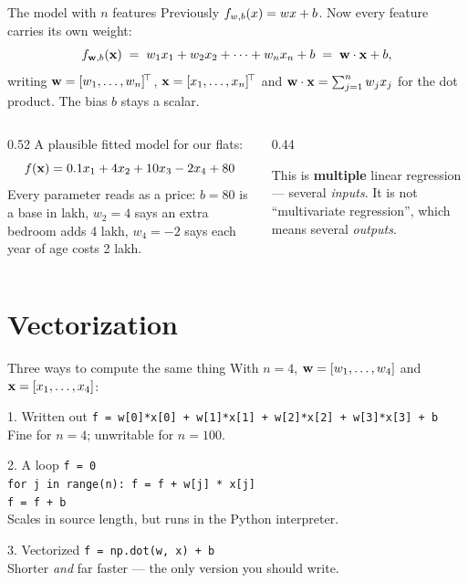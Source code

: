 \documentclass[aspectratio=169,10pt]{beamer}
\begin{document}
\begin{frame}{The model with $n$ features}
  \small
  Previously $f_{w,b}(x)=wx+b$. Now every feature carries its own weight:
  \[
    f_{\mathbf{w},b}(\mathbf{x}) \;=\; w_1x_1 + w_2x_2 + \dots + w_nx_n + b
    \;=\; \mathbf{w}\cdot\mathbf{x} + b ,
  \]
  writing $\mathbf{w}=[w_1,\dots,w_n]^{\!\top}$, $\mathbf{x}=[x_1,\dots,x_n]^{\!\top}$ and
  $\mathbf{w}\cdot\mathbf{x}=\sum_{j=1}^{n}w_jx_j$ for the dot product. The bias $b$ stays a scalar.
  \begin{columns}[T,onlytextwidth]
    \begin{column}{0.52\textwidth}
      \footnotesize
      A plausible fitted model for our flats:
      \[ f(\mathbf{x}) = 0.1x_1 + 4x_2 + 10x_3 - 2x_4 + 80 \]
      Every parameter reads as a price: $b=80$ is a base in lakh, $w_2=4$ says an extra
      bedroom adds 4 lakh, $w_4=-2$ says each year of age costs 2 lakh.
    \end{column}
    \begin{column}{0.44\textwidth}
      \begin{keyidea}
        \footnotesize
        This is \textbf{multiple} linear regression --- several \emph{inputs}. It is not
        ``multivariate regression'', which means several \emph{outputs}.
      \end{keyidea}
    \end{column}
  \end{columns}
\end{frame}

\section{Vectorization}

\begin{frame}{Three ways to compute the same thing}
  \footnotesize
  With $n=4$, $\mathbf{w} = [w_1,\dots,w_4]$ and $\mathbf{x}=[x_1,\dots,x_4]$:
  \begin{block}{1. Written out}
    \texttt{f = w[0]*x[0] + w[1]*x[1] + w[2]*x[2] + w[3]*x[3] + b}\\
    Fine for $n=4$; unwritable for $n=100$.
  \end{block}
  \begin{block}{2. A loop}
    \texttt{f = 0}\\
    \texttt{for j in range(n): f = f + w[j] * x[j]}\\
    \texttt{f = f + b}\\
    Scales in source length, but runs in the Python interpreter.
  \end{block}
  \begin{block}{3. Vectorized}
    \texttt{f = np.dot(w, x) + b}\\
    Shorter \emph{and} far faster --- the only version you should write.
  \end{block}
\end{frame}
\end{document}
